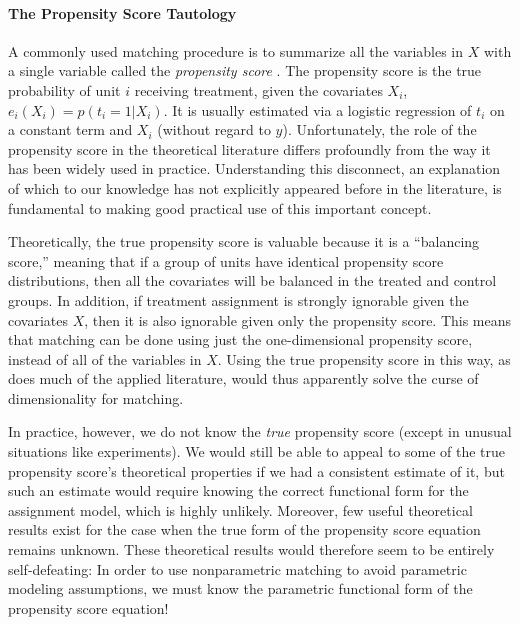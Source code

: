 \documentclass[11pt,titlepage]{article}
\begin{document}
\paragraph{The Propensity Score Tautology}
A commonly used matching procedure is to summarize all the variables
in $X$ with a single variable called the \emph{propensity score}
\citep{RosRub83}.  The propensity score is the true probability of
unit $i$ receiving treatment, given the covariates $X_i$, $e_i(X_i) =
p(t_i=1 | X_i)$.  It is usually estimated via a logistic regression of
$t_i$ on a constant term and $X_i$ (without regard to $y$).
Unfortunately, the role of the propensity score in the theoretical
literature differs profoundly from the way it has been widely used in
practice.  Understanding this disconnect, an explanation of which to
our knowledge has not explicitly appeared before in the literature, is
fundamental to making good practical use of this important concept.

Theoretically, the true propensity score is valuable because it is a
``balancing score,'' meaning that if a group of units have identical
propensity score distributions, then all the covariates will be
balanced in the treated and control groups.  In addition, if treatment
assignment is strongly ignorable given the covariates $X$, then it is
also ignorable given only the propensity score.  This means that
matching can be done using just the one-dimensional propensity score,
instead of all of the variables in $X$.  Using the true propensity
score in this way, as does much of the applied literature, would thus
apparently solve the curse of dimensionality for matching.

In practice, however, we do not know the \emph{true} propensity score
(except in unusual situations like experiments).  We would still be
able to appeal to some of the true propensity score's theoretical
properties if we had a consistent estimate of it, but such an estimate
would require knowing the correct functional form for the assignment
model, which is highly unlikely.  Moreover, few useful theoretical
results exist for the case when the true form of the propensity score
equation remains unknown.  These theoretical results would therefore
seem to be entirely self-defeating: In order to use nonparametric
matching to avoid parametric modeling assumptions, we must know the
parametric functional form of the propensity score equation!
\end{document}

